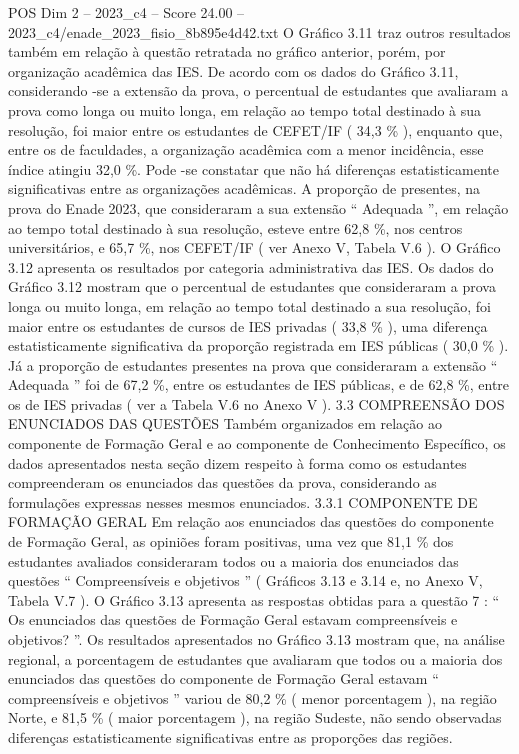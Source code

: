 \begin{textsample}{POS Dim 2 – 2023\_c4 – Score 24.00 – 2023\_c4/enade\_2023\_fisio\_8b895e4d42.txt}
O Gráfico 3.11 traz outros resultados também em relação à questão retratada no gráfico anterior, porém, por organização acadêmica das IES.
De acordo com os dados do Gráfico 3.11, considerando -se a extensão da prova, o percentual de estudantes que avaliaram a prova como longa ou muito longa, em relação ao tempo total destinado à sua resolução, foi maior entre os estudantes de CEFET/IF ( 34,3 \% ), enquanto que, entre os de faculdades, a organização acadêmica com a menor incidência, esse índice atingiu 32,0 \%.
Pode -se constatar que não há diferenças estatisticamente significativas entre as organizações acadêmicas.
A proporção de presentes, na prova do Enade 2023, que consideraram a sua extensão “ Adequada ”, em relação ao tempo total destinado à sua resolução, esteve entre 62,8 \%, nos centros universitários, e 65,7 \%, nos CEFET/IF ( ver Anexo V, Tabela V.6 ).
O Gráfico 3.12 apresenta os resultados por categoria administrativa das IES.
Os dados do Gráfico 3.12 mostram que o percentual de estudantes que consideraram a prova longa ou muito longa, em relação ao tempo total destinado a sua resolução, foi maior entre os estudantes de cursos de IES privadas ( 33,8 \% ), uma diferença estatisticamente significativa da proporção registrada em IES públicas ( 30,0 \% ).
Já a proporção de estudantes presentes na prova que consideraram a extensão “ Adequada ” foi de 67,2 \%, entre os estudantes de IES públicas, e de 62,8 \%, entre os de IES privadas ( ver a Tabela V.6 no Anexo V ). 3.3 COMPREENSÃO DOS ENUNCIADOS DAS QUESTÕES Também organizados em relação ao componente de Formação Geral e ao componente de Conhecimento Específico, os dados apresentados nesta seção dizem respeito à forma como os estudantes compreenderam os enunciados das questões da prova, considerando as formulações expressas nesses mesmos enunciados. 3.3.1 COMPONENTE DE FORMAÇÃO GERAL Em relação aos enunciados das questões do componente de Formação Geral, as opiniões foram positivas, uma vez que 81,1 \% dos estudantes avaliados consideraram todos ou a maioria dos enunciados das questões “ Compreensíveis e objetivos ” ( Gráficos 3.13 e 3.14 e, no Anexo V, Tabela V.7 ).
O Gráfico 3.13 apresenta as respostas obtidas para a questão 7 : “ Os enunciados das questões de Formação Geral estavam compreensíveis e objetivos? ”.
Os resultados apresentados no Gráfico 3.13 mostram que, na análise regional, a porcentagem de estudantes que avaliaram que todos ou a maioria dos enunciados das questões do componente de Formação Geral estavam “ compreensíveis e objetivos ” variou de 80,2 \% ( menor porcentagem ), na região Norte, e 81,5 \% ( maior porcentagem ), na região Sudeste, não sendo observadas diferenças estatisticamente significativas entre as proporções das regiões.

\end{textsample}
